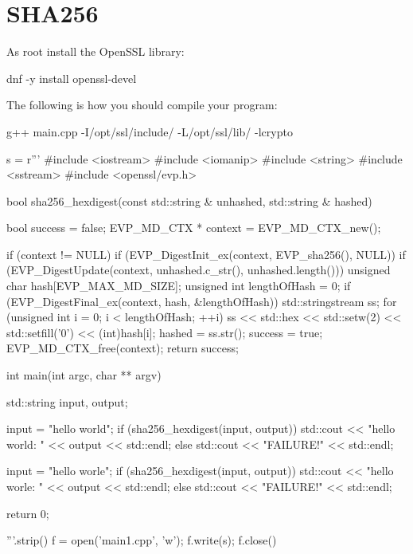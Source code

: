 \begin{comment}
https://stackoverflow.com/questions/2262386/generate-sha256-with-openssl-and-c/10632725
https://crypto.stackexchange.com/questions/87434/is-double-sha-256-the-best-choice-for-bitcoin

https://www.cs.uaf.edu/2013/spring/cs463/lecture/02_20_SHA256.html
https://cpp.hotexamples.com/examples/-/-/EVP_sha512/cpp-evp_sha512-function-examples.html

\end{comment}



\section{SHA256}

As root install the OpenSSL library:
\begin{console}
dnf -y install openssl-devel
\end{console}
The following is how you should compile your program:
\begin{console}[fontsize=\small]
g++ main.cpp -I/opt/ssl/include/ -L/opt/ssl/lib/ -lcrypto
\end{console}
\begin{python}
s = r'''
#include <iostream>
#include <iomanip>
#include <string>
#include <sstream>
#include <openssl/evp.h>

bool sha256_hexdigest(const std::string & unhashed, std::string & hashed)
{
    bool success = false;
    EVP_MD_CTX * context = EVP_MD_CTX_new();

    if (context != NULL)
    {
        if (EVP_DigestInit_ex(context, EVP_sha256(), NULL))
        {
            if (EVP_DigestUpdate(context,
                                 unhashed.c_str(), unhashed.length()))
            {
                unsigned char hash[EVP_MAX_MD_SIZE];
                unsigned int lengthOfHash = 0;
                if (EVP_DigestFinal_ex(context, hash, &lengthOfHash))
                {
                    std::stringstream ss;
                    for (unsigned int i = 0; i < lengthOfHash; ++i)
                    {
                        ss << std::hex << std::setw(2) << std::setfill('0')
                           << (int)hash[i];
                    }
                    hashed = ss.str();
                    success = true;
                }
            }
        }
        EVP_MD_CTX_free(context);
    }
    return success;
}

int main(int argc, char ** argv)
{
    std::string input, output;

    input = "hello world";
    if (sha256_hexdigest(input, output))
    {
        std::cout << "hello world: " << output << std::endl;
    }
    else
    {
        std::cout << "FAILURE!" << std::endl;
    }
    
    input = "hello worle";
    if (sha256_hexdigest(input, output))
    {
        std::cout << "hello worle: " << output << std::endl;
    }
    else
    {
        std::cout << "FAILURE!" << std::endl;
    }
    
    return 0;
}
'''.strip()
f = open('main1.cpp', 'w'); f.write(s); f.close()
\end{python}
